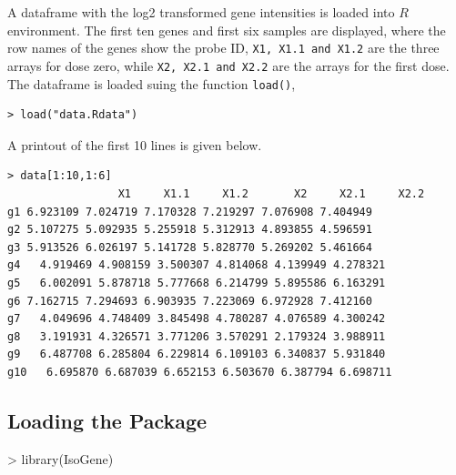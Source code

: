 \documentclass[10pt]{article}
\newenvironment{boxit}{\begin{lrbox}{\savepar}
\begin{minipage}[b]{5.0in}}
{\end{minipage}\end{lrbox}\fbox{\usebox{\savepar}}}
\begin{document}
A dataframe with the log2 transformed gene intensities is loaded
into $R$ environment. The first ten genes and first six samples are
displayed, where the row names of the genes show the probe ID,
\texttt{X1, X1.1 and X1.2} are the three arrays for dose zero, while
\texttt{X2, X2.1 and X2.2} are the arrays for the first dose. The dataframe is loaded suing the function \texttt{load()},
\begin{center}
\begin{boxit}
\begin{verbatim}
> load("data.Rdata")
\end{verbatim}
\end{boxit}
\end{center}
A printout of the first 10 lines is given below.
\begin{center}
\begin{boxit}
\begin{verbatim}
> data[1:10,1:6]
                 X1     X1.1     X1.2       X2     X2.1     X2.2
g1 6.923109 7.024719 7.170328 7.219297 7.076908 7.404949
g2 5.107275 5.092935 5.255918 5.312913 4.893855 4.596591
g3 5.913526 6.026197 5.141728 5.828770 5.269202 5.461664
g4   4.919469 4.908159 3.500307 4.814068 4.139949 4.278321
g5   6.002091 5.878718 5.777668 6.214799 5.895586 6.163291
g6 7.162715 7.294693 6.903935 7.223069 6.972928 7.412160
g7   4.049696 4.748409 3.845498 4.780287 4.076589 4.300242
g8   3.191931 4.326571 3.771206 3.570291 2.179324 3.988911
g9   6.487708 6.285804 6.229814 6.109103 6.340837 5.931840
g10   6.695870 6.687039 6.652153 6.503670 6.387794 6.698711
\end{verbatim}
\end{boxit}
\end{center}

\subsection{Loading the Package}


\begin{Schunk}
\begin{Sinput}
> library(IsoGene)
\end{Sinput}
\end{Schunk}
\end{document}
